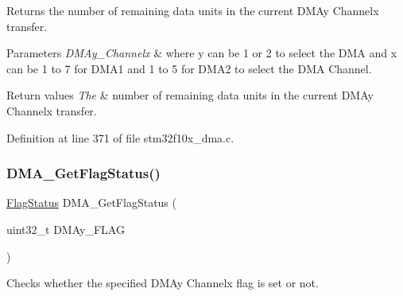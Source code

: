 Returns the number of remaining data units in the current D\+M\+Ay Channelx transfer. 


\begin{DoxyParams}{Parameters}
{\em D\+M\+Ay\+\_\+\+Channelx} & where y can be 1 or 2 to select the D\+MA and x can be 1 to 7 for D\+M\+A1 and 1 to 5 for D\+M\+A2 to select the D\+MA Channel. \\
\hline
\end{DoxyParams}

\begin{DoxyRetVals}{Return values}
{\em The} & number of remaining data units in the current D\+M\+Ay Channelx transfer. \\
\hline
\end{DoxyRetVals}


Definition at line 371 of file stm32f10x\+\_\+dma.\+c.

\mbox{\label{group___d_m_a___private___functions_gafb30b7a891834c267eefd5d30b688a9f}} 
\subsubsection{\texorpdfstring{D\+M\+A\+\_\+\+Get\+Flag\+Status()}{DMA\_GetFlagStatus()}}
{\footnotesize\ttfamily \hyperlink{group___exported__types_ga89136caac2e14c55151f527ac02daaff}{Flag\+Status} D\+M\+A\+\_\+\+Get\+Flag\+Status (\begin{DoxyParamCaption}\item[{uint32\+\_\+t}]{D\+M\+Ay\+\_\+\+F\+L\+AG }\end{DoxyParamCaption})}



Checks whether the specified D\+M\+Ay Channelx flag is set or not. 



